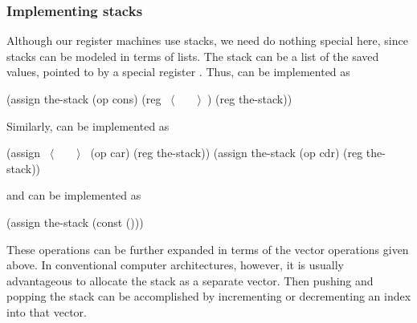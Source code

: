 \subsubsection*{Implementing stacks}

Although our register machines use stacks, we need do nothing special here,
since stacks can be modeled in terms of lists.  The stack can be a list of the
saved values, pointed to by a special register .  Thus,  can be implemented as

\begin{codeBlock}
(assign the-stack (op cons) (reg ~\(\langle \)~~~~\(\rangle \)~) (reg the-stack))
\end{codeBlock}

\noindent
Similarly,  can be implemented as

\begin{codeBlock}
(assign ~\(\langle \)~~~~\(\rangle \)~ (op car) (reg the-stack))
(assign the-stack (op cdr) (reg the-stack))
\end{codeBlock}

\noindent
and  can be implemented as

\begin{codeBlock}
(assign the-stack (const ()))
\end{codeBlock}

\noindent
These operations can be further expanded in terms of the vector operations
given above.  In conventional computer architectures, however, it is usually
advantageous to allocate the stack as a separate vector.  Then pushing and
popping the stack can be accomplished by incrementing or decrementing an index
into that vector.

